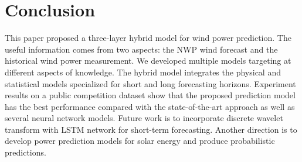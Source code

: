 \documentclass[conference]{IEEEtran}
\begin{document}
\section{Conclusion}
This paper proposed a three-layer hybrid model for wind power prediction. The useful information comes from two aspects: the NWP wind forecast and the historical wind power measurement. We developed multiple models targeting at different aspects of knowledge. The hybrid model integrates the physical and statistical models specialized for short and long forecasting horizons. Experiment results on a public competition dataset show that the proposed prediction model has the best performance compared with the state-of-the-art approach as well as several neural network models.
Future work is to incorporate discrete wavelet transform with LSTM network for short-term forecasting. Another direction is to develop power prediction models for solar energy and produce probabilistic predictions.




%
%
\end{document}
